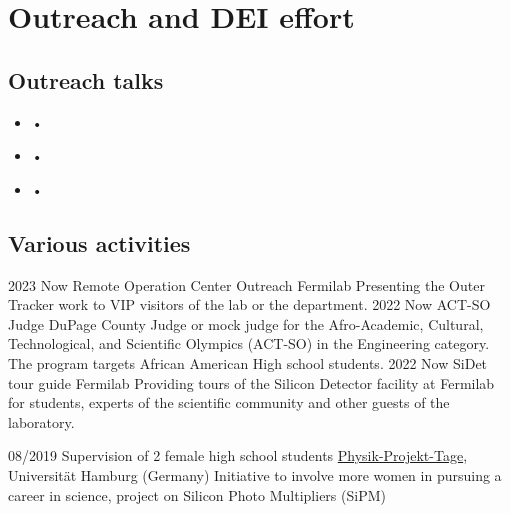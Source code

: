 \ifacademic
  \section{Outreach and DEI effort}
  \subsection{Outreach talks}
\vskip 10pt

\begin{itemize}

\item  {} • ~

\item  {} • ~

\item  {} • ~

\end{itemize}

\subsection{Various activities}
\position
      {2023 \textemdash{} Now} 
      {Remote Operation Center Outreach}
      {Fermilab}
      {Presenting the Outer Tracker work to VIP visitors of the lab or the department.}
\position
      {2022 \textemdash{} Now} 
      {ACT-SO Judge}
      {DuPage County}
      {Judge or mock judge for the Afro-Academic, Cultural, Technological, and Scientific Olympics (ACT-SO) in the Engineering category. The program targets African American High school students.}
     \position
      {2022 \textemdash{} Now} 
      {SiDet tour guide}
      {Fermilab}
      {Providing tours of the Silicon Detector facility at Fermilab for students, experts of the scientific community and other guests of the laboratory.}

	\position
      {08/2019} 
      {Supervision of 2 female high school students}
      {\href{https://www.ppt.uni-hamburg.de}{Physik-Projekt-Tage}, Universit\"{a}t Hamburg (Germany)}
      {Initiative to involve more women in pursuing a career in science, project on Silicon Photo Multipliers (SiPM)}
